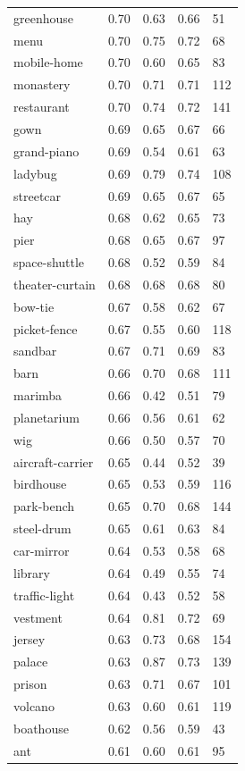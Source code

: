 \begin{center}
\begin{longtable}{lllll}
greenhouse & 0.70 & 0.63 & 0.66 & 51 \\
menu & 0.70 & 0.75 & 0.72 & 68 \\
mobile-home & 0.70 & 0.60 & 0.65 & 83 \\
monastery & 0.70 & 0.71 & 0.71 & 112 \\
restaurant & 0.70 & 0.74 & 0.72 & 141 \\
gown & 0.69 & 0.65 & 0.67 & 66 \\
grand-piano & 0.69 & 0.54 & 0.61 & 63 \\
ladybug & 0.69 & 0.79 & 0.74 & 108 \\
streetcar & 0.69 & 0.65 & 0.67 & 65 \\
hay & 0.68 & 0.62 & 0.65 & 73 \\
pier & 0.68 & 0.65 & 0.67 & 97 \\
space-shuttle & 0.68 & 0.52 & 0.59 & 84 \\
theater-curtain & 0.68 & 0.68 & 0.68 & 80 \\
bow-tie & 0.67 & 0.58 & 0.62 & 67 \\
picket-fence & 0.67 & 0.55 & 0.60 & 118 \\
sandbar & 0.67 & 0.71 & 0.69 & 83 \\
barn & 0.66 & 0.70 & 0.68 & 111 \\
marimba & 0.66 & 0.42 & 0.51 & 79 \\
planetarium & 0.66 & 0.56 & 0.61 & 62 \\
wig & 0.66 & 0.50 & 0.57 & 70 \\
aircraft-carrier & 0.65 & 0.44 & 0.52 & 39 \\
birdhouse & 0.65 & 0.53 & 0.59 & 116 \\
park-bench & 0.65 & 0.70 & 0.68 & 144 \\
steel-drum & 0.65 & 0.61 & 0.63 & 84 \\
car-mirror & 0.64 & 0.53 & 0.58 & 68 \\
library & 0.64 & 0.49 & 0.55 & 74 \\
traffic-light & 0.64 & 0.43 & 0.52 & 58 \\
vestment & 0.64 & 0.81 & 0.72 & 69 \\
jersey & 0.63 & 0.73 & 0.68 & 154 \\
palace & 0.63 & 0.87 & 0.73 & 139 \\
prison & 0.63 & 0.71 & 0.67 & 101 \\
volcano & 0.63 & 0.60 & 0.61 & 119 \\
boathouse & 0.62 & 0.56 & 0.59 & 43 \\
ant & 0.61 & 0.60 & 0.61 & 95 \\

\end{longtable}
\end{center}
